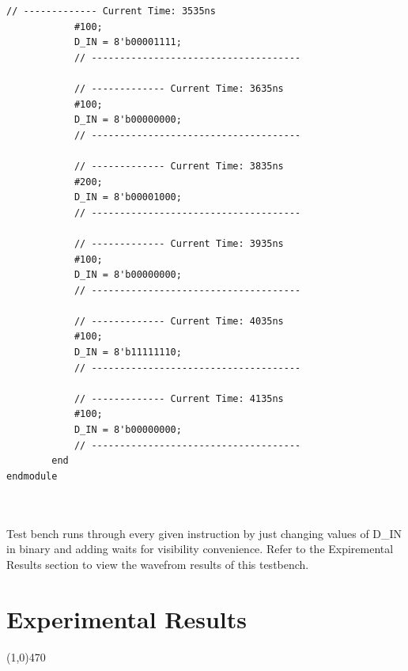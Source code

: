 \documentclass[12pt]{article}
\begin{document}
\begin{Verbatim}[frame=single, fontsize= \small]
			// ------------- Current Time: 3535ns 
			#100;
			D_IN = 8'b00001111;
			// -------------------------------------
			
			// ------------- Current Time: 3635ns 
			#100;
			D_IN = 8'b00000000;
			// -------------------------------------
			
			// ------------- Current Time: 3835ns 
			#200;
			D_IN = 8'b00001000;
			// -------------------------------------
			
			// ------------- Current Time: 3935ns 
			#100;
			D_IN = 8'b00000000;
			// -------------------------------------
			
			// ------------- Current Time: 4035ns 
			#100;
			D_IN = 8'b11111110;
			// -------------------------------------
			
			// ------------- Current Time: 4135ns 
			#100;
			D_IN = 8'b00000000;
			// -------------------------------------
		end 
endmodule

	
		\end{Verbatim}
		Test bench runs through every given instruction by just changing values of D\_IN in binary and adding waits for visibility convenience. Refer to the Expiremental Results section to view the wavefrom results of this testbench.
\newpage			
\section{Experimental Results}\vspace{-.7cm} \line(1,0){470}
\end{document}
